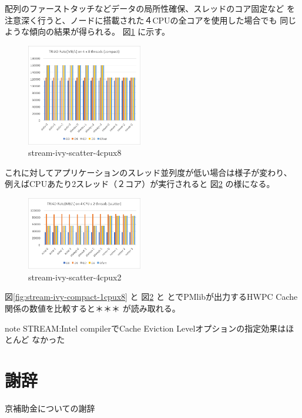 \documentclass[submit,techrep,noauthor]{ipsj}
\begin{document}
配列のファーストタッチなどデータの局所性確保、スレッドのコア固定など
を注意深く行うと、ノードに搭載された４CPUの全コアを使用した場合でも
同じような傾向の結果が得られる。
図\ref{fig:stream-ivy-scatter-4cpux8} に示す。\\

\begin{figure}[tb]
\centering\includegraphics[width=0.45\textwidth]{figs/stream-ivy-scatter-4cpux8.png}
\caption{stream-ivy-scatter-4cpux8}
\label{fig:stream-ivy-scatter-4cpux8}
\end{figure}

これに対してアプリケーションのスレッド並列度が低い場合は様子が変わり、
例えばCPUあたり2スレッド（２コア）が実行されると
図\ref{fig:stream-ivy-scatter-4cpux2} の様になる。\\

\begin{figure}[tb]
\centering\includegraphics[width=0.45\textwidth]{figs/stream-ivy-scatter-4cpux2.png}
\caption{stream-ivy-scatter-4cpux2}
\label{fig:stream-ivy-scatter-4cpux2}
\end{figure}

図\ref{fig:stream-ivy-compact-1cpux8} と
図\ref{fig:stream-ivy-scatter-4cpux2} と
とでPMlibが出力するHWPC Cache関係の数値を比較すると＊＊＊
が読み取れる。


{ \color{blue} \par
note STREAM:Intel compilerでCache Eviction Levelオプションの指定効果はほとんど
なかった
} \par


\section{謝辞}
京補助金についての謝辞




%
\end{document}
